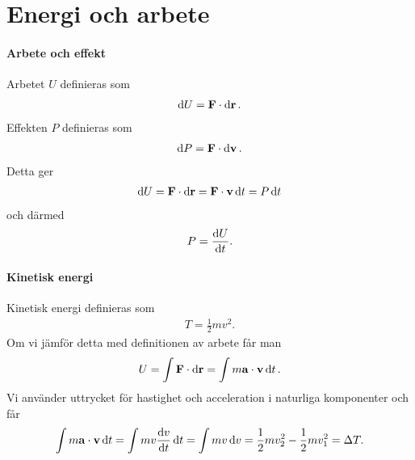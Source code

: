 \section{Energi och arbete}

\paragraph{Arbete och effekt}
Arbetet $U$ definieras som
\begin{align*}
	\dd{U} = \vb{F}\cdot\dd{\vb{r}}.
\end{align*}
Effekten $P$ definieras som
\begin{align*}
	\dd{P} = \vb{F}\cdot\dd{\vb{v}}.
\end{align*}
Detta ger
\begin{align*}
	\dd{U} = \vb{F}\cdot\dd{\vb{r}} = \vb{F}\cdot\vb{v}\dd{t} = P\dd{t}
\end{align*}
och därmed
\begin{align*}
	P = \dv{U}{t}.
\end{align*}

\paragraph{Kinetisk energi}
Kinetisk energi definieras som
\begin{align*}
	T = \frac{1}{2}mv^2.
\end{align*}
Om vi jämför detta med definitionen av arbete får man
\begin{align*}
	U = \int\vb{F}\cdot\dd{\vb{r}} = \int m\vb{a}\cdot\vb{v}\dd{t}.
\end{align*}
Vi använder uttrycket för hastighet och acceleration i naturliga komponenter och får
\begin{align*}
	\int m\vb{a}\cdot\vb{v}\dd{t} = \int mv\dv{v}{t}\dd{t} = \int mv\dd{v} = \frac{1}{2}mv_2^2 - \frac{1}{2}mv_1^2 = \Delta T.
\end{align*}